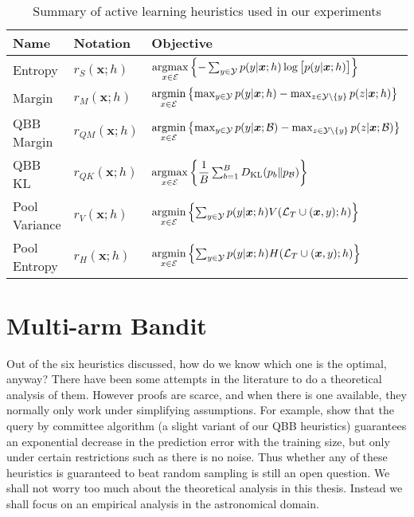 \begin{table}[h]
	\caption {Summary of active learning heuristics used in our experiments} \label{tab:heuristics}
	\centering
	\begin{tabular}{lll}
		\toprule
		{Name}  & Notation &  Objective  \\
		\midrule
		Entropy & $r_S(\bm{x}; h)$
			& $\argmax_{x \in \Ecal} \left\{-\sum_{y \in \Y} p(y | \bm{x}; h)
            \log \big[ p(y | \bm{x}; h) \big] \right\}$
			\\[2ex]
		Margin & $r_M(\bm{x}; h)$
			& $\argmin_{x \in \Ecal} \left\{ \max_{y \in \Y} p(y | \bm{x}; h) -
            \max_{z \in \Y \setminus \{y\}} p(z | \bm{x}; h)  \right\}$
			\\[2ex]
		QBB Margin & $r_{QM}(\bm{x}; h)$
			& $\argmin_{x \in \Ecal} \left\{ \max_{y \in \Y} p(y | \bm{x}; \B) -
            \max_{z \in \Y \setminus \{y\}} p(z | \bm{x}; \B)  \right\}$
			\\[2ex]
		QBB KL & $r_{QK}(\bm{x}; h)$
			& $\argmax_{x \in \Ecal} \left\{ \dfrac{1}{B}
               \sum_{b=1}^B D_{\mathrm{KL}}(p_b\|p_\B) \right\}$
			\\[2ex]
		Pool Variance & $r_V(\bm{x}; h)$
			& $\argmin_{x \in \Ecal} \left\{ \sum_{y \in \Y} p(y | \bm{x}; h)
            V(\Labelled_T \cup (\bm{x}, y); h)  \right\}$
			\\[2ex]
		Pool Entropy & $r_{H}(\bm{x}; h)$
			& $\argmin_{x \in \Ecal} \left\{ \sum_{y\in \Y} p(y|\bm{x}; h) 
               H(\Labelled_T \cup (\bm{x}, y); h) \right\}  $
			\\
		\bottomrule
	\end{tabular}
\end{table}


\section{Multi-arm Bandit} 
\label{sec:bandit}

Out of the six heuristics discussed, how do we know which one is the optimal, anyway? There have
been some attempts in the literature to do a theoretical analysis of them. However proofs are
scarce, and when there is one available, they normally only work under simplifying assumptions. For
example,  show that the query by committee algorithm (a slight variant of our
QBB heuristics) guarantees an exponential decrease in the prediction error with the training size,
but only under certain restrictions such as there is no noise. Thus whether any of these heuristics
is guaranteed to beat random sampling is still an open question. We shall not worry too much about
the theoretical analysis in this thesis. Instead we shall focus on an empirical analysis in the
astronomical domain.

